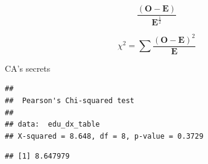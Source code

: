 \documentclass[
  ignorenonframetext,
]{beamer}
\newenvironment{Shaded}{\begin{snugshade}}{\end{snugshade}}
\newcommand{\DataTypeTok}[1]{\textcolor[rgb]{0.13,0.29,0.53}{#1}}
\newcommand{\KeywordTok}[1]{\textcolor[rgb]{0.13,0.29,0.53}{\textbf{#1}}}
\newcommand{\NormalTok}[1]{#1}
\newcommand{\OperatorTok}[1]{\textcolor[rgb]{0.81,0.36,0.00}{\textbf{#1}}}
\newcommand{\StringTok}[1]{\textcolor[rgb]{0.31,0.60,0.02}{#1}}
\begin{document}
\begin{frame}

\begingroup\Huge

\begin{equation*}
\frac{(\mathbf{O} - \mathbf{E})}{\mathbf{E}^{\frac{1}{2}}}
\end{equation*} \endgroup

\end{frame}

\begin{frame}

\begingroup\Huge

\begin{equation*}
\chi^2 = \sum{\frac{(\mathbf{O} - \mathbf{E})^2}{\mathbf{E}}}
\end{equation*} \endgroup

\end{frame}

\begin{frame}[fragile]{CA's secrets}
\protect\hypertarget{cas-secrets}{}

\begin{Shaded}
\end{Shaded}

\begin{verbatim}
## 
##  Pearson's Chi-squared test
## 
## data:  edu_dx_table
## X-squared = 8.648, df = 8, p-value = 0.3729
\end{verbatim}

\begin{Shaded}
\end{Shaded}

\begin{verbatim}
## [1] 8.647979
\end{verbatim}

\end{frame}
\end{document}
